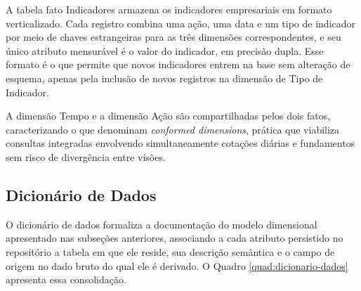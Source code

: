 A tabela fato Indicadores armazena os indicadores empresariais em formato verticalizado. Cada registro combina uma ação, uma data e um tipo de indicador por meio de chaves estrangeiras para as três dimensões correspondentes, e seu único atributo mensurável é o valor do indicador, em precisão dupla. Esse formato é o que permite que novos indicadores entrem na base sem alteração de esquema, apenas pela inclusão de novos registros na dimensão de Tipo de Indicador.

A dimensão Tempo e a dimensão Ação são compartilhadas pelos dois fatos, caracterizando o que  denominam \textit{conformed dimensions}, prática que viabiliza consultas integradas envolvendo simultaneamente cotações diárias e fundamentos sem risco de divergência entre visões.

\subsection{Dicionário de Dados}
\label{sec:dicionario-dados}

O dicionário de dados formaliza a documentação do modelo dimensional apresentado nas subseções anteriores, associando a cada atributo persistido no repositório a tabela em que ele reside, sua descrição semântica e o campo de origem no dado bruto do qual ele é derivado. O Quadro \ref{quad:dicionario-dados} apresenta essa consolidação.

